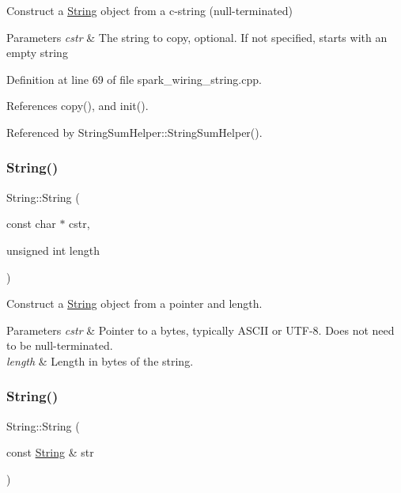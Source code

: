 Construct a \hyperlink{class_string}{String} object from a c-\/string (null-\/terminated) 


\begin{DoxyParams}{Parameters}
{\em cstr} & The string to copy, optional. If not specified, starts with an empty string \\
\hline
\end{DoxyParams}


Definition at line 69 of file spark\+\_\+wiring\+\_\+string.\+cpp.



References copy(), and init().



Referenced by String\+Sum\+Helper\+::\+String\+Sum\+Helper().

\mbox{\label{class_string_a20cfefac6f5b37f40dcb35826b563a5a}} 
\subsubsection{\texorpdfstring{String()}{String()}\hspace{0.1cm}{\footnotesize\ttfamily [2/13]}}
{\footnotesize\ttfamily String\+::\+String (\begin{DoxyParamCaption}\item[{const char $\ast$}]{cstr,  }\item[{unsigned int}]{length }\end{DoxyParamCaption})}



Construct a \hyperlink{class_string}{String} object from a pointer and length. 


\begin{DoxyParams}{Parameters}
{\em cstr} & Pointer to a bytes, typically A\+S\+C\+II or U\+T\+F-\/8. Does not need to be null-\/terminated.\\
\hline
{\em length} & Length in bytes of the string. \\
\hline
\end{DoxyParams}
\mbox{\label{class_string_a5774bcd4a4c232a8aec5a3ec6d01a157}} 
\subsubsection{\texorpdfstring{String()}{String()}\hspace{0.1cm}{\footnotesize\ttfamily [3/13]}}
{\footnotesize\ttfamily String\+::\+String (\begin{DoxyParamCaption}\item[{const \hyperlink{class_string}{String} \&}]{str }\end{DoxyParamCaption})}



